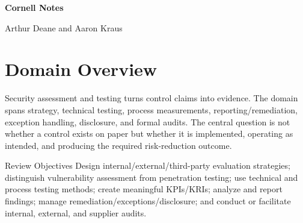 \documentclass[10pt,letterpaper]{article}
\begin{document}
\hypersetup{pageanchor=false}
\begin{titlepage}\pagecolor{navy}\color{white}\vspace{0.25in}{\large Sixth Edition \textbullet\ 2021\par}\vfill{\Huge\bfseries Cornell Notes\par}\vspace{0.25in}{\LARGE Domain 6\par}\vspace{0.08in}{\LARGE\bfseries Security Assessment and Testing\par}\vfill{\large Arthur Deane and Aaron Kraus\par}\vspace{0.12in}{\normalsize Study and review companion\par}\end{titlepage}
\hypersetup{pageanchor=true}\nopagecolor\color{black}

\section*{\color{navy}Domain Overview}
Security assessment and testing turns control claims into evidence. The domain spans strategy, technical testing, process measurements, reporting/remediation, exception handling, disclosure, and formal audits. The central question is not whether a control exists on paper but whether it is implemented, operating as intended, and producing the required risk-reduction outcome.

\begin{summarybox}{Review Objectives}
Design internal/external/third-party evaluation strategies; distinguish vulnerability assessment from penetration testing; use technical and process testing methods; create meaningful KPIs/KRIs; analyze and report findings; manage remediation/exceptions/disclosure; and conduct or facilitate internal, external, and supplier audits.
\end{summarybox}
\end{document}
